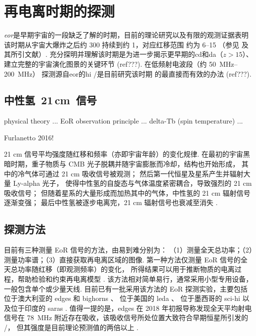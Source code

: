
\chapter{再电离时期的探测}
\label{chap:detection}


\emph{\acf{eor}}是早期宇宙的一段缺乏了解的时期，目前的理论研究以及有限的观测证据表明
该时期从宇宙大爆炸之后约 \SI{300}{\Myr} 持续到约 \SI{1}{\Gyr}，对应红移范围
约为 \numrange{6}{15} （参见  及其所引文献）.
充分探明并理解该时期是为进一步揭示更早期的\acl{cd}和\acl{da}（$z > 15$）、
建立完整的宇宙演化图景的关键环节 (ref???).
在低频射电波段（约 \SIrange{50}{200}{\MHz}）
探测源自\acl{eor}的\acl{hi} \hisignal/是目前研究该时期
的最直接而有效的办法 (ref???).


\section{中性氢~21\texorpdfstring{\,}{ }cm~信号}
\label{sec:21cm-signal}

physical theory ...
EoR observation principle ...
delta-Tb (spin temperature) ...

Furlanetto 2016!

21 cm 信号平均强度随红移和频率（亦即宇宙年龄）的变化规律.
在最初的宇宙黑暗时期，重子物质与 CMB 光子脱耦并随宇宙膨胀而冷却，结构也开始形成，
其中的冷气体可通过 21 cm 吸收信号被观测；
然后第一代恒星及星系产生并辐射大量 Ly-alpha 光子，
使得中性氢的自旋态与气体温度紧密耦合，导致强烈的 21 cm 吸收信号；
但随着星系的大量形成而加热其中的气体，中性氢的 21 cm 辐射信号逐渐变强；
最后中性氢被逐步电离完，21 cm 辐射信号也衰减至消失
\cite{pritchard2012}.


\section{探测方法}
\label{sec:det-methods}

目前有三种测量 EoR 信号的方法，由易到难分别为：
（1）测量全天总功率；（2）测量功率谱；（3）直接获取再电离区域的图像.
第一种方法仅测量 EoR 信号的全天总功率随红移（即观测频率）的变化，
所得结果可以用于推断物质的电离过程，帮助检验和约束再电离模型
\cite{pritchard2012,liu2016}.
该方法相对简单易行，通常采用小型专用设备，一般包含单个或少量天线.
目前已有一批采用该方法的 EoR 探测实验，主要包括
位于澳大利亚的 \ac{edges} \cite{bowman2008} 和
\ac{bighorns} \cite{sokolowski2015}、
位于美国的 \ac{leda} \cite{greenhill2012}、
位于墨西哥的 \ac{sci-hi} \cite{voytek2014}
以及位于印度的 \ac{saras} \cite{singh2018}.
值得一提的是，\acs{edges} 在 2018 年初报导称发现全天平均射电信号在 \SI{78}{\MHz}
附近存在吸收，该吸收信号所处位置大致符合早期恒星所引发的 \hisignal/，
但其强度是目前理论预测值的两倍以上 \cite{bowman2018}.

